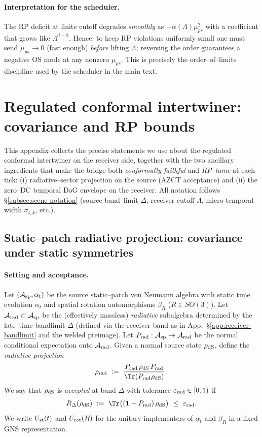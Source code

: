 \documentclass[10pt]{article}
\theoremstyle{definition}
\theoremstyle{plain}
\begin{document}
\paragraph{Interpretation for the scheduler.}\label{par:uom-main-241}
The RP deficit at finite cutoff degrades \emph{smoothly} as \(-\alpha(\Lambda)\mu_{ps}^2\) with a coefficient that grows like \(\Lambda^{d+2}\). Hence: to keep RP violations uniformly small one must send \(\mu_{ps}\to0\) (fast enough) \emph{before} lifting \(\Lambda\); reversing the order guarantees a negative OS mode at any nonzero \(\mu_{ps}\).
This is precisely the order–of–limits discipline used by the scheduler in the main text.


\section{Regulated conformal intertwiner: covariance and RP bounds}
\label{app:reg-intertwiner}

This appendix collects the precise statements we use about the regulated conformal intertwiner on the receiver side, together with the two ancillary ingredients that make the bridge both \emph{conformally faithful} and \emph{RP–tame} at each tick: (i) radiative–sector projection on the source (AZCT acceptance) and (ii) the zero–DC temporal DoG envelope on the receiver. All notation follows §\ref{subsec:scene-notation} (source band–limit $\Delta$, receiver cutoff $\Lambda$, micro temporal width $\sigma_{t,k}$, etc.).

\subsection{Static--patch radiative projection: covariance under static symmetries}
\label{app:rad-proj}

\paragraph{Setting and acceptance.}\label{par:uom-main-242}
Let $(\mathcal A_{\rm sp},\alpha_t)$ be the source static--patch von Neumann algebra with static time evolution
$\alpha_t$ and spatial rotation automorphisms $\beta_R$ ($R\in SO(3)$). Let $\mathcal A_{\rm rad}\subset\mathcal A_{\rm sp}$
be the (effectively massless) \emph{radiative} subalgebra determined by the late--time bandlimit $\Delta$ (defined via the
receiver band as in App.~\S\ref{app:receiver-bandlimit} and the welded preimage). Let
$P_{\rm rad}:\mathcal A_{\rm sp}\to \mathcal A_{\rm rad}$ be the normal conditional expectation onto $\mathcal A_{\rm rad}$.
Given a normal source state $\rho_{\rm dS}$, define the \emph{radiative projection}
\[
\rho_{\rm rad}\ :=\ \frac{P_{\rm rad}\,\rho_{\rm dS}\,P_{\rm rad}}{\Tr(P_{\rm rad}\rho_{\rm dS})}\,.
\]
We say that $\rho_{\rm dS}$ is \emph{accepted} at band $\Delta$ with tolerance $\varepsilon_{\rm rad}\in[0,1)$ if
\begin{equation}
\label{eq:accept-static}
R_\Delta(\rho_{\rm dS})\ :=\ \Tr\big((\mathbf 1-P_{\rm rad})\,\rho_{\rm dS}\big)\ \le\ \varepsilon_{\rm rad}.
\end{equation}
We write $U_{\rm st}(t)$ and $U_{\rm rot}(R)$ for the unitary implementers of $\alpha_t$ and $\beta_R$ in a fixed GNS representation.
\end{document}
